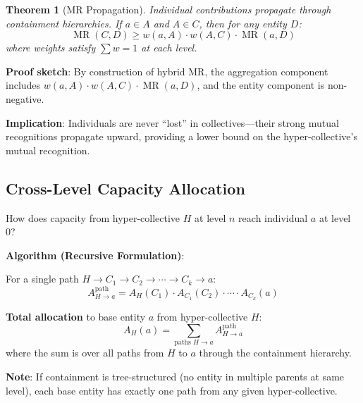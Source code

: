 \documentclass[11pt,a4paper]{article}
\newtheorem{theorem}{Theorem}[section]
\theoremstyle{definition}
\theoremstyle{remark}
\DeclareMathOperator{\MR}{MR}
\begin{document}
\begin{theorem}[MR Propagation]
Individual contributions propagate through containment hierarchies. If $a \in A$ and $A \in C$, then for any entity $D$:
\[ \MR(C,D) \ge w(a,A) \cdot w(A,C) \cdot \MR(a,D) \]
where weights satisfy $\sum w = 1$ at each level.
\end{theorem}

\textbf{Proof sketch}: By construction of hybrid MR, the aggregation component includes $w(a,A) \cdot w(A,C) \cdot \MR(a,D)$, and the entity component is non-negative.

\textbf{Implication}: Individuals are never ``lost'' in collectives---their strong mutual recognitions propagate upward, providing a lower bound on the hyper-collective's mutual recognition.

\subsection{Cross-Level Capacity Allocation}

How does capacity from hyper-collective $H$ at level $n$ reach individual $a$ at level 0?

\textbf{Algorithm (Recursive Formulation)}:

For a single path $H \rightarrow C_1 \rightarrow C_2 \rightarrow \cdots \rightarrow C_k \rightarrow a$:
\[ A_{H \rightarrow a}^{\text{path}} = A_H(C_1) \cdot A_{C_1}(C_2) \cdot \cdots \cdot A_{C_k}(a) \]

\textbf{Total allocation} to base entity $a$ from hyper-collective $H$:
\[ A_H(a) = \sum_{\text{paths } H \rightarrow a} A_{H \rightarrow a}^{\text{path}} \]
where the sum is over all paths from $H$ to $a$ through the containment hierarchy.

\textbf{Note}: If containment is tree-structured (no entity in multiple parents at same level), each base entity has exactly one path from any given hyper-collective.
\end{document}
